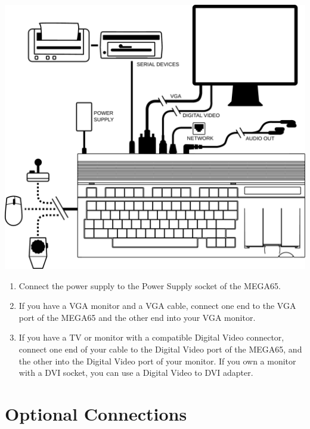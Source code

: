 \includegraphics[width=\linewidth]{images/illustrations/mega65-top.pdf}

\newpage

\begin{enumerate}
	\item Connect the power supply to the Power Supply socket of the MEGA65.
	\item If you have a VGA monitor and a VGA cable, connect one end to the VGA port of the MEGA65 and the other end into your VGA monitor.
	\item If you have a TV or monitor with a compatible Digital Video connector, connect one end of your cable to the Digital Video port of the MEGA65, and the other into the Digital Video port of your monitor. If you own a monitor with a DVI socket, you can use a Digital Video to DVI adapter.
\end{enumerate}

\section{Optional Connections}

